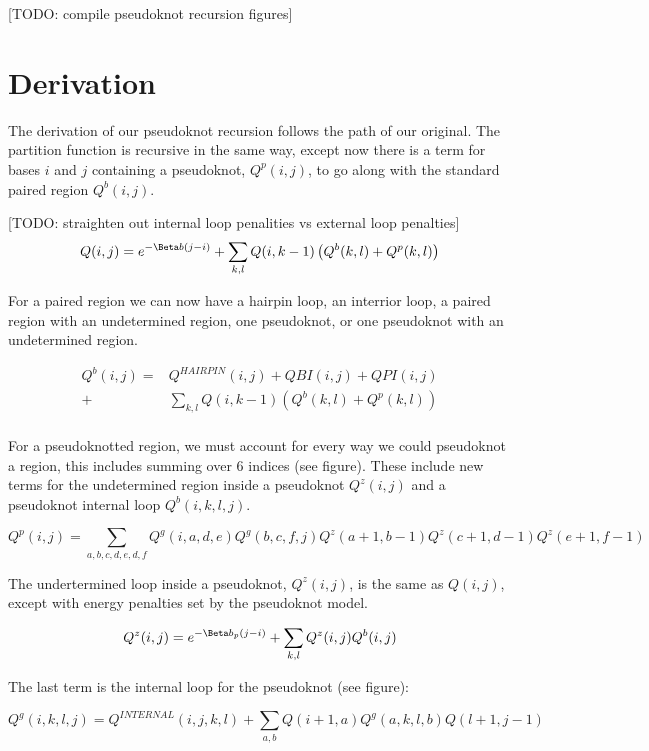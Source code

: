 [TODO: compile pseudoknot recursion figures]

\section{Derivation}

The derivation of our pseudoknot recursion follows the path of our
original. The partition function is recursive in the same way, except
now there is a term for bases $i$ and $j$ containing a pseudoknot,
$Q^p(i,j)$, to go along with the standard paired region $Q^b(i,j)$. 

[TODO: straighten out internal loop penalities vs external loop penalties]
\begin{equation}
Q(i,j) = e^{- \Beta b (j - i)} + \sum_{k,l} Q(i, k-1) \left ( Q^b(k, l) + Q^p(k, l)  \right )
\end{equation}

For a paired region we can now have a hairpin loop, an interrior loop,
a paired region with an undetermined region, one pseudoknot, or one
pseudoknot with an undetermined region.

\begin{equation}
\begin{split}
Q^b(i,j) =& Q^{HAIRPIN}(i, j) + QBI(i, j)  + QPI(i, j)\\
 +& \sum_{k,l} Q(i, k-1)( Q^b(k, l) + Q^p(k, l) ) \\ 
\end{split}
\end{equation}

For a pseudoknotted region, we must account for every way we could
pseudoknot a region, this includes summing over 6 indices (see
figure). These include new terms for the undetermined region inside a
pseudoknot $Q^z(i,j)$ and a pseudoknot internal loop $Q^b(i, k, l, j)$.

\begin{equation}
Q^p(i, j) = \sum_{a,b,c,d,e,d,f} Q^g(i, a, d, e) Q^g(b, c, f, j)
Q^z(a+1, b-1) Q^z(c+1, d-1) Q^z(e+1, f-1)
\end{equation}

The undertermined loop inside a pseudoknot, $Q^z(i,j)$, is the same as
$Q(i,j)$, except with energy penalties set by the pseudoknot model. 

\begin{equation}
Q^z(i,j) = e ^{-\Beta b_p (j-i)} + \sum_{k,l} Q^z(i,j) Q^b(i,j)
\end{equation}

The last term is the internal loop for the pseudoknot (see figure):

\begin{equation}
Q^g(i, k, l, j) = Q^{INTERNAL}(i,j,k,l) +  \sum_{a,b} Q(i+1, a) Q^g(a, k, l, b) Q(l+1, j -1) 
\end{equation}


